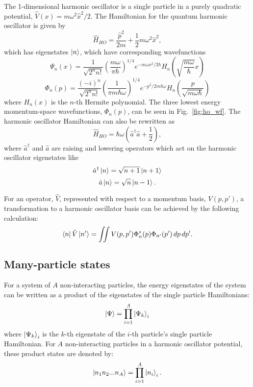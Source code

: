 The 1-dimensional harmonic oscillator is a single particle in a purely quadratic potential, $\hat{V}(x) = m\omega^2 \hat{x}^2/2$. The Hamiltonian for the quantum harmonic oscillator is given by
\begin{equation}
\hat{H}_{HO} = \frac{\hat{p}^2}{2m} + \frac{1}{2}m\omega^2\hat{x}^2,
\end{equation}
which has eigenstates $\ket{n}$, which have corresponding wavefunctions
\begin{equation}
\Psi_n(x) = \frac{1}{\sqrt{2^n n!}}\left(\frac{m \omega}{\pi \hbar}\right)^{1/4}e^{-m \omega x^2 / 2 \hbar} H_n\left(\sqrt{\frac{m \omega}{\hbar}}x\right)
\end{equation}
\begin{equation}
\Phi_n(p) = \frac{(-i)^n}{\sqrt{2^n n!}}\left(\frac{1}{\pi m \hbar \omega}\right)^{1/4}e^{-p^2 / 2 m \hbar \omega} H_n\left(\frac{p}{\sqrt{m \omega \hbar}}\right)
\end{equation}
where $H_n(x)$ is the $n$-th Hermite polynomial. The three lowest energy momentum-space wavefunctions, $\Phi_n(p)$, can be seen in Fig.~\ref{fig:ho_wf}. The harmonic oscillator Hamiltonian can also be rewritten as
\begin{equation}
\hat{H}_{HO} = \hbar \omega \left(\hat{a}^\dagger \hat{a} + \frac{1}{2}\right),
\end{equation}
where $\hat{a}^\dagger$ and $\hat{a}$ are raising and lowering operators which act on the harmonic oscillator eigenstates like
\begin{equation}
\hat{a}^\dagger\ket{n} = \sqrt{n + 1}\ket{n+1}
\end{equation}
\begin{equation}
\hat{a}\ket{n} = \sqrt{n}\ket{n-1}.
\end{equation}

For an operator, $\hat{V}$, represented with respect to a momentum basis, $V(p, p')$, a transformation to a harmonic oscillator basis can be achieved by the following calculation:
\begin{equation}\label{eq:ho_transform}
\bra{n}\hat{V}\ket{n'} = \iint V(p, p') \Phi_n^*(p) \Phi_{n'}(p') \,dp\,dp'.
\end{equation}

\subsection{Many-particle states}

For a system of $A$ non-interacting particles, the energy eigenstates of the system can be written as a product of the eigenstates of the single particle Hamiltonians:
\begin{equation}
\ket{\Psi} = \prod_{i=1}^{A}\ket{\Psi_k}_i
\end{equation}
where $\ket{\Psi_k}_i$ is the $k$-th eigenstate of the $i$-th particle's single particle Hamiltonian. For $A$ non-interacting particles in a harmonic oscillator potential, these product states are denoted by:
\begin{equation}
\ket{n_1 n_2 ... n_A} = \prod_{i=1}^{A}\ket{n_i}_i.
\end{equation}


